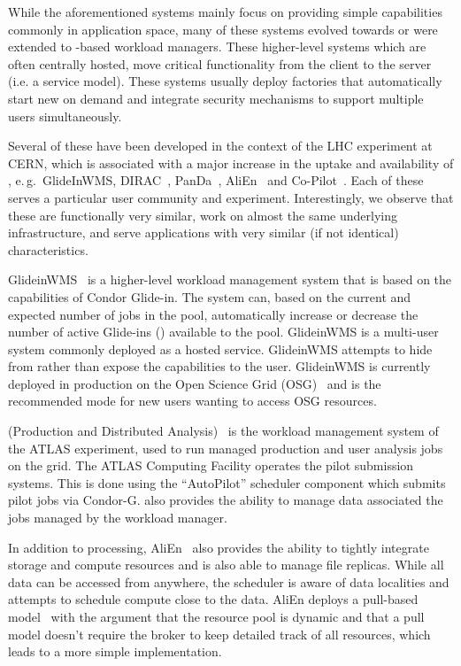 \documentclass{sig-alternate}
\begin{document}
While the aforementioned systems mainly focus on providing simple \pilot
capabilities commonly in application space, many of these systems evolved
towards or were extended to \pilot-based workload managers.
These higher-level systems which are often centrally hosted, move critical
functionality from the client to the server (i.e. a service model). These
systems usually deploy \pilot factories that automatically start new \pilots on
demand and integrate security mechanisms to support multiple users
simultaneously.

Several of these have been developed in the context of the LHC experiment at
CERN, which is associated with a major increase in the uptake and availability
of \pilots, e.\,g.\ GlideInWMS, DIRAC~\cite{1742-6596-219-6-062049},
PanDa~\cite{1742-6596-331-7-072069}, AliEn~\cite{1742-6596-119-6-062012} and
Co-Pilot~\cite{copilot-tr}. Each of these \pilots serves a particular user
community and experiment. Interestingly, we observe that these \pilots are
functionally very similar, work on almost the same underlying infrastructure,
and serve applications with very similar (if not identical) characteristics.

GlideinWMS~\cite{1742-6596-119-6-062044} is a higher-level workload management
system that is based on the \pilot capabilities of Condor Glide-in. The system
can, based on the current and expected number of jobs in the pool,
automatically increase or decrease the number of active Glide-ins (\pilots)
available to the pool. GlideinWMS is a multi-user \pilotjob system commonly
deployed as a hosted service. GlideinWMS attempts to hide from rather than
expose the \pilot capabilities to the user. GlideinWMS is currently deployed in
production on the Open Science Grid (OSG)~\cite{url_osg} and is the recommended
mode for new users wanting to access OSG resources.

\panda (Production and Distributed Analysis)~\cite{1742-6596-331-7-072069} is
the workload management system of the ATLAS experiment, used to run managed
production and user analysis jobs on the grid. The ATLAS Computing Facility
operates the pilot submission systems. This is done using the \panda
“AutoPilot” scheduler component which submits pilot jobs via Condor-G. \panda
also provides the ability to manage data associated the jobs managed by the
\panda workload manager.

In addition to processing, AliEn~\cite{1742-6596-119-6-062012} also provides
the ability to tightly integrate storage and compute resources and is also able
to manage file replicas. While all data can be accessed from anywhere, the
scheduler is aware of data localities and attempts to schedule compute close to
the data. AliEn deploys a pull-based model~\cite{Saiz:2003:alien} with the
argument that the resource pool is dynamic and that a pull model doesn't
require the broker to keep detailed track of all resources, which leads to a
more simple implementation.
\end{document}
